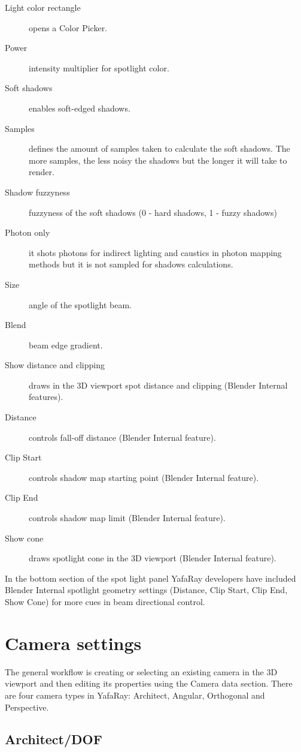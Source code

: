 \begin{description}
\item[Light color rectangle] opens a Color Picker.
\item[Power] intensity multiplier for spotlight color.
\item[Soft shadows] enables soft-edged shadows.
\item[Samples] defines the amount of samples taken to calculate the soft shadows. The more samples, the less noisy the shadows but the longer it will take to render.
\item[Shadow fuzzyness] fuzzyness of the soft shadows (0 - hard shadows, 1 - fuzzy shadows)
\item[Photon only] it shots photons for indirect lighting and caustics in photon mapping methods but it is not sampled for shadows calculations.
\item[Size] angle of the spotlight beam.
\item[Blend] beam edge gradient.
\item[Show distance and clipping] draws in the 3D viewport spot distance and clipping (Blender Internal features).
\item[Distance] controls fall-off distance (Blender Internal feature).
\item[Clip Start] controls shadow map starting point (Blender Internal feature).
\item[Clip End] controls shadow map limit (Blender Internal feature).
\item[Show cone] draws spotlight cone in the 3D viewport (Blender Internal feature).
\end{description}

In the bottom section of the spot light panel YafaRay developers have included Blender Internal spotlight geometry settings (Distance, Clip Start, Clip End, Show Cone) for more cues in beam directional control.

\section{Camera settings}\label{sec:camerasettings}

The general workflow is creating or selecting an existing camera in the 3D viewport and then editing its properties using the Camera data section. There are four camera types in YafaRay: Architect, Angular, Orthogonal and Perspective.

\subsection{Architect/DOF}

